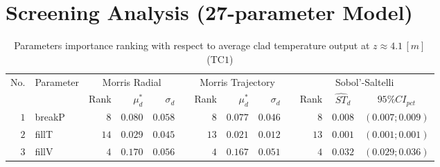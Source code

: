 \cleardoublepage
\section{Screening Analysis (27-parameter Model)}\label{app:tbl_results_screening}

\begin{table*}[!htbp]\centering
{}
\caption{Parameters importance ranking with respect to average clad temperature output at $z \approx 4.1 \, [m]$ (TC$1$)}
\label{tab:app_screening_tc1_average}
\begin{tabular}{@{}rlrrrrrrrrrcc@{}}\toprule
\multirow{2}{*}{\footnotesize{No.}} & \multirow{2}{*}{\footnotesize{Parameter}} & \multicolumn{3}{c}{\footnotesize{Morris Radial}} & \phantom{a} & \multicolumn{3}{c}{\footnotesize{Morris Trajectory}}  &\phantom{a}& \multicolumn{3}{c}{\footnotesize{Sobol'-Saltelli}}                               \\             
                                                                                  \cmidrule{3-5}                                                   \cmidrule{7-9}                                                      \cmidrule{11-13}
                                    &                                           & \footnotesize{Rank}   & $\mu^*_d$ & $\sigma_d$   &             & \footnotesize{Rank} & $\mu^*_d$ & $\sigma_d$          &           & \footnotesize{Rank} & \footnotesize{$\hat{ST}_d$} & \footnotesize{$95\%CI_{pct}$}\\ \midrule
\footnotesize{$1 $} & \footnotesize{breakP   } & \footnotesize{$8 $} & \footnotesize{$0.080$} & \footnotesize{$0.058$} && \footnotesize{$8 $} & \footnotesize{$0.077$} & \footnotesize{$0.046$} && \footnotesize{$8 $} & \footnotesize{$0.008$} & \footnotesize{$(0.007;0.009)$} \\
\footnotesize{$2 $} & \footnotesize{fillT    } & \footnotesize{$14$} & \footnotesize{$0.029$} & \footnotesize{$0.045$} && \footnotesize{$13$} & \footnotesize{$0.021$} & \footnotesize{$0.012$} && \footnotesize{$13$} & \footnotesize{$0.001$} & \footnotesize{$(0.001;0.001)$} \\
\footnotesize{$3 $} & \footnotesize{fillV    } & \footnotesize{$4 $} & \footnotesize{$0.170$} & \footnotesize{$0.056$} && \footnotesize{$4 $} & \footnotesize{$0.167$} & \footnotesize{$0.051$} && \footnotesize{$4 $} & \footnotesize{$0.032$} & \footnotesize{$(0.029;0.036)$} \\

\end{tabular}
\end{table*}
